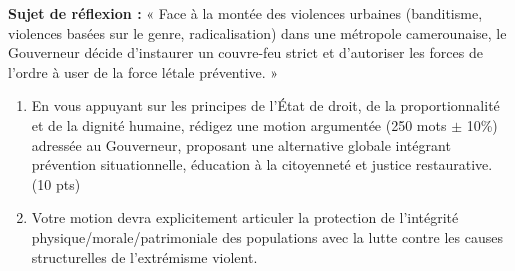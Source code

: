 \documentclass[11pt]{article}
\begin{document}
\begin{exercice}
\textbf{Sujet de réflexion :} « Face à la montée des violences urbaines (banditisme, violences basées sur le genre, radicalisation) dans une métropole camerounaise, le Gouverneur décide d'instaurer un couvre-feu strict et d'autoriser les forces de l'ordre à user de la force létale préventive. »
\begin{enumerate}
    \item En vous appuyant sur les principes de l'État de droit, de la proportionnalité et de la dignité humaine, rédigez une motion argumentée (250 mots $\pm$ 10\%) adressée au Gouverneur, proposant une alternative globale intégrant prévention situationnelle, éducation à la citoyenneté et justice restaurative. (10 pts)
    \item Votre motion devra explicitement articuler la protection de l'intégrité physique/morale/patrimoniale des populations avec la lutte contre les causes structurelles de l'extrémisme violent.
\end{enumerate}
\end{exercice}
\end{document}

